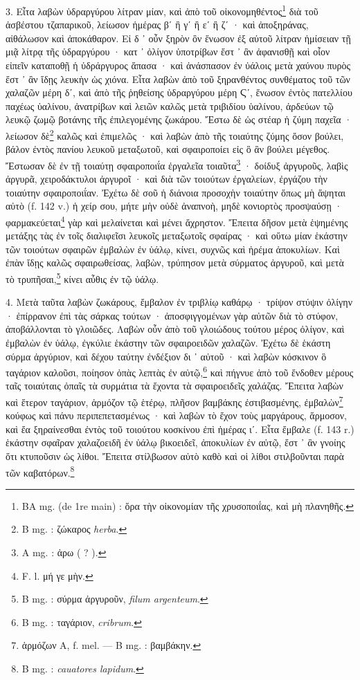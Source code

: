 \documentclass[a4paper, 11pt, oneside, polutonikogreek, french]{article}
\begin{document}
3. Εἶτα λαβὼν ὑδραργύρου λίτραν μίαν, καὶ ἀπὸ τοῦ οἰκονομηθέντος\footnote{BA mg. (de 1re main) : ὅρα τὴν οἰκονομίαν τῆς χρυσοποιΐας, καὶ μὴ πλανηθῆς.} διὰ τοῦ ἀσβέστου τζαπαρικοῦ, λείωσον ἡμέρας βʹ ἢ γʹ ἢ εʹ ἢ ζʹ · καὶ ἀποξηράνας, αἰθάλωσον καὶ ἀποκάθαρον. Εἰ δ ᾽ οὖν ξηρὸν ὂν ἕνωσον ἐξ αὐτοῦ λίτραν ἡμίσειαν τῇ μιᾷ λίτρᾳ τῆς ὑδραργύρου · κατ ᾽ ὀλίγον ὑποτρίβων ἔστ ᾽ ἂν ἀφανισθῇ καὶ οἷον εἰπεῖν καταποθῇ ἡ ὑδράργυρος ἅπασα · καὶ ἀνάσπασον ἐν ὑάλοις μετὰ χαύνου πυρὸς ἔστ ᾽ ἂν ἴδῃς λευκὴν ὡς χιόνα. Εἶτα λαβὼν ἀπὸ τοῦ ξηρανθέντος συνθέματος τοῦ τῶν χαλαζῶν μέρη δʹ, καὶ ἀπὸ τῆς ῥηθείσης ὑδραργύρου μέρη Ϛʹ, ἕνωσον ἐντὸς πατελλίου παχέως ὑαλίνου, ἀνατρίβων καὶ λειῶν καλῶς μετὰ τριβιδίου ὑαλίνου, ἀρδεύων τῷ λευκῷ ζωμῷ βοτάνης τῆς ἐπιλεγομένης ζωκάρου. Ἔστω δὲ ὡς στέαρ ἡ ζύμη παχεῖα · λείωσον δὲ\footnote{B mg. : ζώκαρος \emph{herba}.} καλῶς καὶ ἐπιμελῶς · καὶ λαβὼν ἀπὸ τῆς τοιαύτης ζύμης ὅσον βούλει, βάλον ἐντὸς πανίου λευκοῦ μεταξωτοῦ, καὶ σφαιροποίει εἰς ὃ ἂν βούλει μέγεθος. Ἔστωσαν δὲ ἐν τῇ τοιαύτῃ σφαιροποιΐα ἐργαλεῖα τοιαῦτα\footnote{A mg. : ἀρω ( ? ).} · δοίδυξ ἀργυροῦς, λαβὶς ἀργυρᾶ, χειροδάκτυλοι ἀργυροῖ · καὶ διὰ τῶν τοιούτων ἐργαλείων, ἐργάζου τὴν τοιαύτην σφαιροποιΐαν. Ἐχέτω δὲ σοῦ ἡ διάνοια προσοχὴν τοιαύτην ὅπως μὴ ἅψηται αὐτὸ (f. 142 v.) ἡ χείρ σου, μήτε μὴν οὐδὲ ἀναπνοὴ, μηδὲ κονιορτὸς προσψαύσῃ · φαρμακεύεται\footnote{F. l. μή γε μὴν.} γὰρ καὶ μελαίνεται καὶ μένει ἄχρηστον. Ἔπειτα δῆσον μετὰ ἑψημένης μετάξης τὰς ἐν τοῖς διαλιφεῖσι λευκοῖς μεταξωτοῖς σφαίρας · καὶ οὕτω μίαν ἑκάστην τῶν τοιούτων σφαιρῶν ἐμβαλὼν ἐν ὑάλῳ, κίνει, συχνῶς καὶ ἠρέμα ἀποκυλίων. Καὶ ἐπὰν ἴδῃς καλῶς σφαιρωθείσας, λαβὼν, τρύπησον μετὰ σύρματος ἀργυροῦ, καὶ μετὰ τὸ τρυπῆσαι,\footnote{B mg. : σύρμα ἀργυροῦν, \emph{filum argenteum}.} κίνει αὖθις ἐν τῷ ὑάλῳ.

4. Μετὰ ταῦτα λαβὼν ζωκάρους, ἔμβαλον ἐν τριβλίῳ καθάρῳ · τρίψον στύψιν ὀλίγην · ἐπίρρανον ἐπὶ τὰς σάρκας τούτων · ἀποσφιγγομένων γὰρ αὐτῶν διὰ τὸ στύφον, ἀποβάλλονται τὸ γλοιῶδες. Λαβὼν οὖν ἀπὸ τοῦ γλοιώδους τούτου μέρος ὀλίγον, καὶ ἐμβαλὼν ἐν ὑάλῳ, ἐγκύλιε ἑκάστην τῶν σφαιροειδῶν χαλαζῶν. Ἐχέτω δὲ ἑκάστη σύρμα ἀργύριον, καὶ δέχου ταύτην ἐνδέξιον δι ᾽ αὐτοῦ · καὶ λαβὼν κόσκινον ὃ ταγάριον καλοῦσι, ποίησον ὀπὰς λεπτὰς ἐν αὐτῷ,\footnote{B mg. : ταγάριον, \emph{cribrum}.} καὶ πήγνυε ἀπὸ τοῦ ἔνδοθεν μέρους ταῖς τοιαύταις ὀπαῖς τὰ συρμάτια τὰ ἔχοντα τὰ σφαιροειδεῖς χαλάζας. Ἔπειτα λαβὼν καὶ ἕτερον ταγάριον, ἁρμόζον τῷ ἑτέρῳ, πλῆσον βαμβάκης ἐστιβασμένης, ἐμβαλὼν\footnote{ἁρμόζων A, f. mel. --- B mg. : βαμβάκην.} κούφως καὶ πάνυ περιπεπετασμένως · καὶ λαβὼν τὸ ἔχον τοὺς μαργάρους, ἅρμοσον, καὶ ἔα ξηραίνεσθαι ἐντὸς τοῦ τοιούτου κοσκίνου ἐπὶ ἡμέρας ιʹ. Εἶτα ἔμβαλε (f. 143 r.) ἑκάστην σφαῖραν χαλαζοειδῆ ἐν ὑάλῳ βικοειδεῖ, ἀποκυλίων ἐν αὐτῷ, ἔστ ᾽ ἂν γνοίης ὅτι κτυποῦσιν ὡς λίθοι. Ἔπειτα στίλβωσον αὐτὸ καθὸ καὶ οἱ λίθοι στιλβοῦνται παρὰ τῶν καβατόρων.\footnote{B mg. : \emph{cauatores lapidum}.}
\end{document}
